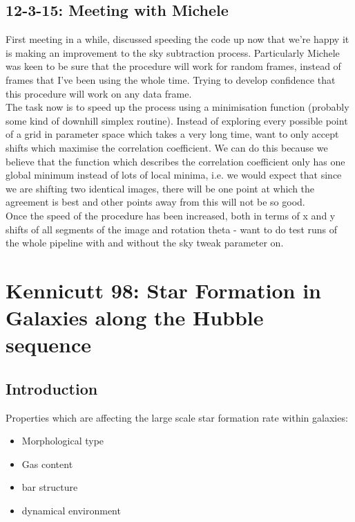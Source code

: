 \documentclass{literature}
\begin{document}
\subsection{12-3-15: Meeting with Michele}
First meeting in a while, discussed speeding the code up now that we're happy it is making an improvement to the sky subtraction process. Particularly Michele was keen to be sure that the procedure will work for random frames, instead of frames that I've been using the whole time. Trying to develop confidence that this procedure will work on any data frame. \\ 
The task now is to speed up the process using a minimisation function (probably some kind of downhill simplex routine). Instead of exploring every possible point of a grid in parameter space which takes a very long time, want to only accept shifts which maximise the correlation coefficient. We can do this because we believe that the function which describes the correlation coefficient only has one global minimum instead of lots of local minima, i.e. we would expect that since we are shifting two identical images, there will be one point at which the agreement is best and other points away from this will not be so good.  \\ 
Once the speed of the procedure has been increased, both in terms of x and y shifts of all segments of the image and rotation theta - want to do test runs of the whole pipeline with and without the sky tweak parameter on.   












\section{Kennicutt 98: Star Formation in Galaxies along the Hubble sequence}

\subsection{Introduction}
Properties which are affecting the large scale star formation rate within galaxies: 
\begin{itemize}
\item Morphological type 
\item Gas content 
\item bar structure 
\item dynamical environment
\end{itemize}
\end{document}

